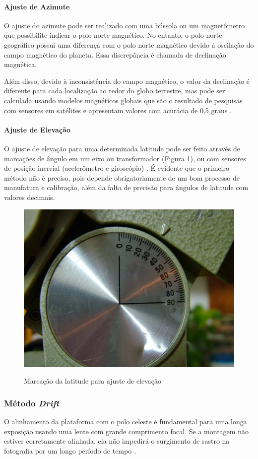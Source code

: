 \paragraph{Ajuste de Azimute}
O ajuste do azimute pode ser realizado com uma bússola ou um magnetômetro que possibilite indicar o polo norte magnético. No entanto, o polo norte geográfico possui uma diferença com o polo norte magnético devido à oscilação do campo magnético do planeta. Essa discrepância é chamada de declinação magnética. 

Além disso, devido à inconsistência do campo magnético, o valor da declinação é diferente para cada localização ao redor do globo terrestre, mas pode ser calculada usando modelos magnéticos globais que são o resultado de pesquisas com sensores em satélites e apresentam valores com acurácia de 0,5 graus \cite{site:noicDecMag}.

\paragraph{Ajuste de Elevação}
O ajuste de elevação para uma determinada latitude pode ser feito através de marcações de ângulo em um eixo ou transformador (Figura \ref{fig:marcacao_latitude}), ou com sensores de posição inercial (acelerômetro e giroscópio) \cite{site:driftLupus}. É evidente que o primeiro método não é preciso, pois depende obrigatoriamente de um bom processo de manufatura e calibração, além da falta de precisão para ângulos de latitude com valores decimais. 

\begin{figure}[!htb]
	\centering
	\caption{Marcação da latitude para ajuste de elevação}
	\includegraphics[width=0.45\linewidth]{figuras/revisaobiblio/marcacao_latitude}
	\label{fig:marcacao_latitude}
\end{figure}

\subsubsection{Método \textit{Drift}}
\label{driftsection}
O alinhamento da plataforma com o polo celeste é fundamental para uma longa exposição usando uma lente com grande comprimento focal. Se a montagem não estiver corretamente alinhada, ela não impedirá o surgimento de rastro na fotografia por um longo período de tempo \cite{book:bbcsky}.  

